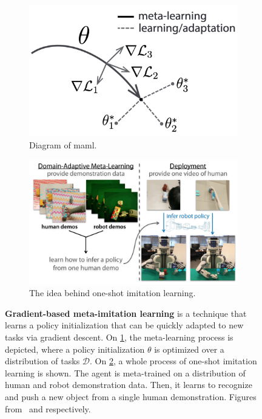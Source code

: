 \begin{figure}
    \centering
   \begin{subfigure}[b]{0.49\linewidth}
        \centering
        \includegraphics[width=\linewidth]{figures/related_work/maml}
        \caption{Diagram of \acrfull{maml}.}
        \label{fig:maml}
    \end{subfigure}
    \hfill
    \begin{subfigure}[b]{0.49\linewidth}
        \centering
        \includegraphics[width=\linewidth]{figures/related_work/one_shot_human}
        \caption{The idea behind one-shot imitation learning.}
        \label{fig:oneshot-human}
    \end{subfigure}
    \caption{\textbf{Gradient-based meta-imitation learning} is a technique that learns a policy initialization that can be quickly adapted to new tasks via gradient descent.
    On \ref{fig:maml}, the meta-learning process is depicted, where a policy initialization $\theta$ is optimized over a distribution of tasks $\mathcal{D}$.
    On \ref{fig:oneshot-human}, a whole process of one-shot imitation learning is shown.
    The agent is meta-trained on a distribution of human and robot demonstration data.
    Then, it learns to recognize and push a new object from a single human demonstration.
    Figures from~\cite{finn2017} and \cite{Yu2018OneShotIF} respectively.}
    \label{fig:maml-mil}
\end{figure}

